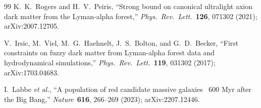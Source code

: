 \documentclass[11pt,a4paper]{article}
\theoremstyle{definition}
\theoremstyle{remark}
\begin{document}
\begin{thebibliography}{99}
K.~K.~Rogers and H.~V.~Peiris,
``Strong bound on canonical ultralight axion dark matter from the Lyman-alpha forest,''
\emph{Phys.\ Rev.\ Lett.}\ \textbf{126}, 071302 (2021);
arXiv:2007.12705.

V.~Irsic, M.~Viel, M.~G.~Haehnelt, J.~S.~Bolton, and G.~D.~Becker,
``First constraints on fuzzy dark matter from Lyman-alpha forest data and hydrodynamical simulations,''
\emph{Phys.\ Rev.\ Lett.}\ \textbf{119}, 031302 (2017);
arXiv:1703.04683.


I.~Labbe \emph{et al.},
``A population of red candidate massive galaxies ~600 Myr after the Big Bang,''
\emph{Nature}\ \textbf{616}, 266--269 (2023);
arXiv:2207.12446.

\end{thebibliography}
\end{document}
